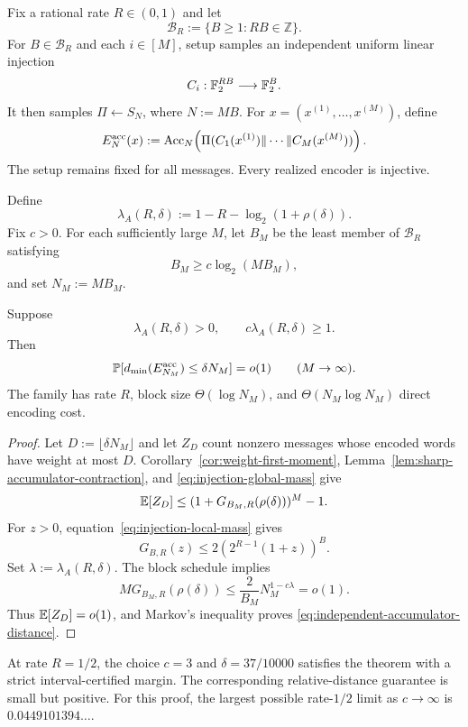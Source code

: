 Fix a rational
rate $R\in(0,1)$ and let
\[
  \mathcal B_R:=\{B\ge1:RB\in\mathbb Z\}.
\]
For $B\in\mathcal B_R$ and each $i\in[M]$, setup samples an independent
uniform linear injection
\[
  C_i:\mathbb F_2^{RB}\longrightarrow\mathbb F_2^B.
\]
It then samples $\Pi\gets S_N$, where $N:=MB$. For
$x=(x^{(1)},\ldots,x^{(M)})$, define
\begin{equation}
  E_N^{\mathrm{acc}}(x)
  :=
  \operatorname{Acc}_N\!\left(
    \Pi(C_1(x^{(1)})\Vert\cdots\Vert C_M(x^{(M)}))
  \right).
  \label{eq:independent-accumulator-spin}
\end{equation}
The setup remains fixed for all messages. Every realized encoder is
injective.

Define
\begin{equation}
  \lambda_A(R,\delta)
  :=
  1-R-\log_2(1+\rho(\delta)).
  \label{eq:accumulator-sparse-exponent}
\end{equation}
Fix $c>0$. For each sufficiently large $M$, let $B_M$ be the least member of
$\mathcal B_R$ satisfying
\[
  B_M\ge c\log_2(MB_M),
\]
and set $N_M:=MB_M$.

\begin{theorem}
\label{thm:independent-accumulator-spin}
Suppose
\[
  \lambda_A(R,\delta)>0,
  \qquad
  c\lambda_A(R,\delta)\ge1.
\]
Then
\begin{equation}
  \mathbb P[d_{\min}(E_{N_M}^{\mathrm{acc}})\le\delta N_M]
  =o(1)
  \qquad(M\to\infty).
  \label{eq:independent-accumulator-distance}
\end{equation}
The family has rate $R$, block size $\Theta(\log N_M)$, and
$\Theta(N_M\log N_M)$ direct encoding cost.
\end{theorem}

\begin{proof}
Let $D:=\lfloor\delta N_M\rfloor$ and let $Z_D$ count nonzero messages whose
encoded words have weight at most $D$. Corollary~\ref{cor:weight-first-moment},
Lemma~\ref{lem:sharp-accumulator-contraction}, and
\eqref{eq:injection-global-mass} give
\[
  \mathbb E[Z_D]
  \le
  (1+G_{B_M,R}(\rho(\delta)))^M-1.
\]
For $z>0$, equation~\eqref{eq:injection-local-mass} gives
\[
  G_{B,R}(z)
  \le
  2\left(2^{R-1}(1+z)\right)^B.
\]
Set $\lambda:=\lambda_A(R,\delta)$. The block schedule implies
\[
  M G_{B_M,R}(\rho(\delta))
  \le
  \frac{2}{B_M}N_M^{1-c\lambda}
  =o(1).
\]
Thus $\mathbb E[Z_D]=o(1)$, and Markov's inequality proves
\eqref{eq:independent-accumulator-distance}.
\end{proof}

At rate $R=1/2$, the choice $c=3$ and
$\delta=37/10000$ satisfies the theorem with a strict interval-certified
margin. The corresponding relative-distance guarantee is small but positive.
For this proof, the largest possible rate-$1/2$ limit as $c\to\infty$ is
$0.0449101394\ldots$.
